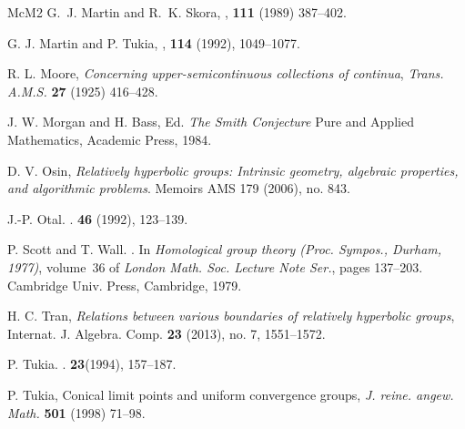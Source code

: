 \documentclass[11pt]{article}
\theoremstyle{definition}
\begin{document}
\begin{thebibliography}{McM2}
G.~J. Martin and R.~K. Skora,
,
 {\bf 111} (1989) 387--402.


G. J. Martin and P. Tukia,
,
 {\bf 114} (1992), 1049--1077.

R. L. Moore, {\it Concerning upper-semicontinuous collections of continua}, {\em Trans.
A.M.S.} {\bf 27} (1925) 416--428.

 J. W. Morgan and H. Bass, Ed.  {\it The Smith Conjecture} Pure and Applied Mathematics, Academic Press,  1984. 

 D. V. Osin, {\it Relatively hyperbolic groups: Intrinsic geometry, algebraic properties, and algorithmic problems}.  Memoirs AMS 179 (2006), no. 843. 

J.-P. Otal.
.
  {\bf 46} (1992), 123--139.


P. Scott and T. Wall.
.
\newblock In {\em Homological group theory ({P}roc. {S}ympos., {D}urham,
  1977)}, volume~36 of {\em London Math. Soc. Lecture Note Ser.}, pages
  137--203. Cambridge Univ. Press, Cambridge, 1979.


 H. C. Tran, {\em Relations between various boundaries of relatively hyperbolic groups}, Internat. J. Algebra. Comp. {\bf 23} (2013), no. 7, 1551--1572. 

P. Tukia.
.
 {\bf 23}(1994), 157--187.


 P. Tukia, Conical limit points and uniform convergence groups, {\it J. reine. angew. Math.} {\bf 501} (1998) 71--98. 



\end{thebibliography}
\end{document}

